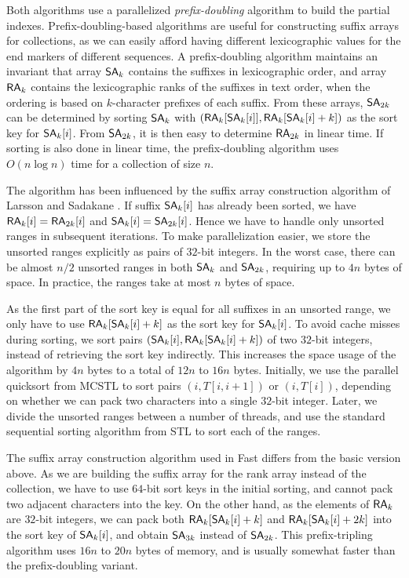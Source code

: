 Both algorithms use a parallelized \emph{prefix-doubling} algorithm to build the partial indexes. Prefix-doubling-based algorithms are useful for constructing suffix arrays for collections, as we can easily afford having different lexicographic values for the end markers of different sequences. A prefix-doubling algorithm maintains an invariant that array $\mathsf{SA}_{k}$ contains the suffixes in lexicographic order, and array $\mathsf{RA}_{k}$ contains the lexicographic ranks of the suffixes in text order, when the ordering is based on $k$\nobreakdash-character prefixes of each suffix. From these arrays, $\mathsf{SA}_{2k}$ can be determined by sorting $\mathsf{SA}_{k}$ with $(\mathsf{RA}_{k}[\mathsf{SA}_{k}[i]], \mathsf{RA}_{k}[\mathsf{SA}_{k}[i]+k])$ as the sort key for $\mathsf{SA}_{k}[i]$. From $\mathsf{SA}_{2k}$, it is then easy to determine $\mathsf{RA}_{2k}$ in linear time. If sorting is also done in linear time, the prefix-doubling algorithm uses $O(n \log n)$ time for a collection of size $n$.

\newpage The algorithm has been influenced by the suffix array construction algorithm of Larsson and Sadakane \cite{Larsson2007}. If suffix $\mathsf{SA}_{k}[i]$ has already been sorted, we have $\mathsf{RA}_{k}[i] = \mathsf{RA}_{2k}[i]$ and $\mathsf{SA}_{k}[i] = \mathsf{SA}_{2k}[i]$. Hence we have to handle only unsorted ranges in subsequent iterations. To make parallelization easier, we store the unsorted ranges explicitly as pairs of $32$\nobreakdash-bit integers. In the worst case, there can be almost $n/2$ unsorted ranges in both $\mathsf{SA}_{k}$ and $\mathsf{SA}_{2k}$, requiring up to $4n$ bytes of space. In practice, the ranges take at most $n$ bytes of space.

As the first part of the sort key is equal for all suffixes in an unsorted range, we only have to use $\mathsf{RA}_{k}[\mathsf{SA}_{k}[i]+k]$ as the sort key for $\mathsf{SA}_{k}[i]$. To avoid cache misses during sorting, we sort pairs $(\mathsf{SA}_{k}[i], \mathsf{RA}_{k}[\mathsf{SA}_{k}[i]+k])$ of two $32$\nobreakdash-bit integers, instead of retrieving the sort key indirectly. This increases the space usage of the algorithm by $4n$ bytes to a total of $12n$ to $16n$ bytes. Initially, we use the parallel quicksort from MCSTL to sort pairs $(i, T[i,i+1])$ or $(i,T[i])$, depending on whether we can pack two characters into a single $32$\nobreakdash-bit integer. Later, we divide the unsorted ranges between a number of threads, and use the standard sequential sorting algorithm from STL to sort each of the ranges.

The suffix array construction algorithm used in Fast differs from the basic version above. As we are building the suffix array for the rank array instead of the collection, we have to use $64$\nobreakdash-bit sort keys in the initial sorting, and cannot pack two adjacent characters into the key. On the other hand, as the elements of $\mathsf{RA}_{k}$ are $32$\nobreakdash-bit integers, we can pack both $\mathsf{RA}_{k}[\mathsf{SA}_{k}[i]+k]$ and $\mathsf{RA}_{k}[\mathsf{SA}_{k}[i]+2k]$ into the sort key of $\mathsf{SA}_{k}[i]$, and obtain $\mathsf{SA}_{3k}$ instead of $\mathsf{SA}_{2k}$. This prefix-tripling algorithm uses $16n$ to $20n$ bytes of memory, and is usually somewhat faster than the prefix-doubling variant.


